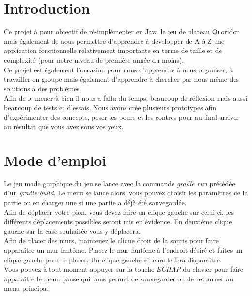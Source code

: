 \documentclass[a4paper, 12pt]{article}
\begin{document}
\tableofcontents

\newpage

\section{Introduction}

Ce projet à pour objectif de ré-implémenter en Java le jeu de plateau Quoridor mais également de nous permettre d'apprendre à développer de A à Z une application fonctionnelle relativement importante en terme de taille et de complexité (pour notre niveau de première année du moins). \\

Ce projet est également l'occasion pour nous d'apprendre à nous organiser, à travailler en groupe mais également d'apprendre à chercher par nous même des solutions à des problèmes. \\

Afin de le mener à bien il nous a fallu du temps, beaucoup de réflexion mais aussi beaucoup de tests et d'essais. Nous avons crée plusieurs prototypes afin d'expérimenter des concepts, peser les pours et les contres pour au final arriver au résultat que vous avez sous vos yeux.

\section{Mode d'emploi}

Le jeu mode graphique du jeu se lance avec la commande \textit{gradle run} précédée d'un
\textit{gradle build}. Le menu se lance alors, vous pouvez choisir les paramètres de la
partie ou en charger une si une partie a déjà été sauvegardée. \\

Afin de déplacer votre pion, vous devez faire un clique gauche sur celui-ci, les différents déplacements possibles seront mis en évidence. En deuxième clique gauche sur la case souhaitée vous y déplacera. \\

Afin de placer des murs, maintenez le clique droit de la souris pour faire apparaître un mur fantôme. Placez le mur fantôme à l'endroit désiré et faites un clique gauche pour le placer. Un clique gauche ailleurs le fera disparaitre. \\

Vous pouvez à tout moment appuyer sur la touche \textit{ECHAP} du clavier pour faire apparaître le menu pause qui vous permet de sauvegarder ou de retourner au menu principal.
\end{document}
